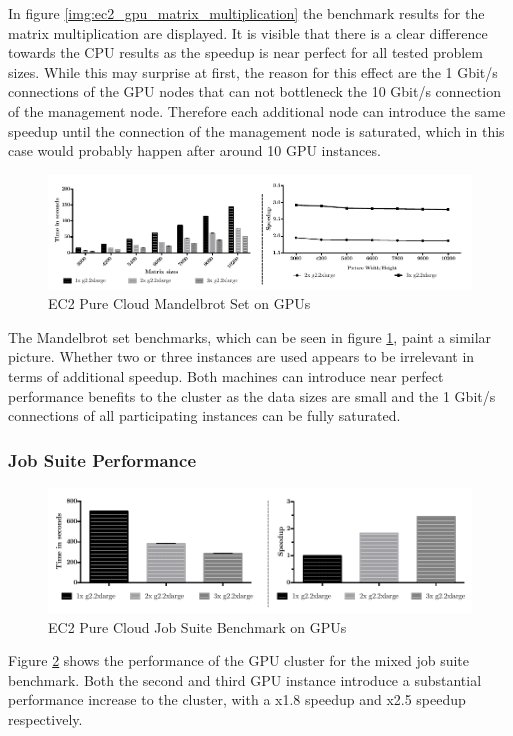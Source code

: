 In figure \ref{img:ec2_gpu_matrix_multiplication} the benchmark results for the matrix multiplication are displayed. It is visible that there is a clear difference towards the CPU results as the speedup is near perfect for all tested problem sizes. While this may surprise at first, the reason for this effect are the 1 Gbit/s connections of the GPU nodes that can not bottleneck the 10 Gbit/s connection of the management node. Therefore each additional node can introduce the same speedup until the connection of the management node is saturated, which in this case would probably happen after around 10 GPU instances.

\begin{figure}[H]
	\includegraphics[width=1.0\textwidth]{images/ec2_gpu_mandelbrot.pdf}
	\centering
	\caption{EC2 Pure Cloud Mandelbrot Set on GPUs}
	\label{img:ec2_gpu_mandelbrot}
\end{figure}

The Mandelbrot set benchmarks, which can be seen in figure \ref{img:ec2_gpu_mandelbrot}, paint a similar picture. Whether two or three instances are used appears to be irrelevant in terms of additional speedup. Both machines can introduce near perfect performance benefits to the cluster as the data sizes are small and the 1 Gbit/s connections of all participating instances can be fully saturated.

\subsubsection*{Job Suite Performance}

\begin{figure}[H]
	\includegraphics[width=1.0\textwidth]{images/ec2_gpu_full_benchmark.pdf}
	\centering
	\caption{EC2 Pure Cloud Job Suite Benchmark on GPUs}
	\label{img:ec2_gpu_full_benchmark}
\end{figure}

Figure \ref{img:ec2_gpu_full_benchmark} shows the performance of the GPU cluster for the mixed job suite benchmark. Both the second and third GPU instance introduce a substantial performance increase to the cluster, with a x1.8 speedup and x2.5 speedup respectively.
